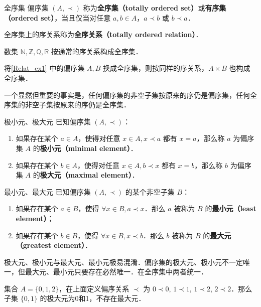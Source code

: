 \begin{definition}{全序集}
偏序集 $(A,\prec)$ 称为\textbf{全序集（totally ordered set）}或\textbf{有序集（ordered set）}，当且仅当对任意 $a,b \in A$，$a \prec b$ 或 $b \prec a$．
\end{definition}
全序集上的序关系称为\textbf{全序关系（totally ordered relation）}．
\begin{example}{}
数集 $\mathbb{N},\mathbb{Z},\mathbb{Q},\mathbb{R}$ 按通常的序关系构成全序集．
\end{example}
\begin{example}{}
将\autoref{Relat_ex1} 中的偏序集 $A,B$ 换成全序集，则按同样的序关系，$A\times B$ 也构成全序集．
\end{example}

一个显然但重要的事实是，任何偏序集的非空子集按原来的序仍是偏序集，任何全序集的非空子集按原来的序仍是全序集．

\begin{definition}{极小元、极大元}
已知偏序集 $(A,\prec)$：
\begin{enumerate}
\item 如果存在某个 $a \in A$，使得对任意 $x \in A, x\prec a$ 都有 $x = a$，那么称 $a$ 为偏序集 $A$ 的\textbf{极小元（minimal element）}．
\item 如果存在某个 $b \in A$，使得对任意 $x \in A, b\prec x$ 都有 $x = b$，那么称 $b$ 为偏序集 $A$ 的\textbf{极大元（maximal element）}．
\end{enumerate}
\end{definition}

\begin{definition}{最小元、最大元}
已知偏序集 $(A,\prec)$ 的某个非空子集 $B$：
\begin{enumerate}
\item 如果存在某个 $a \in B$，使得 $\forall x \in B, a \prec x$．那么 $a$ 被称为 $B$ 的\textbf{最小元（least element）}；
\item 如果存在某个 $b \in B$，使得 $\forall x \in B, x \prec b$．那么 $b$ 被称为 $B$ 的\textbf{最大元（greatest element）}．
\end{enumerate}
\end{definition}

极大元、极小元与最大元、最小元极易混淆．偏序集的极大元、极小元不一定唯一，但最大元、最小元只要存在必然唯一．在全序集中两者统一．

\begin{example}{}
集合 $A=\{0,1,2\}$，在上面定义偏序关系 $\prec$ 为 $0\prec 0$, $1\prec 1$, $1\prec 2$, $2\prec 2$．那么子集 $\{0,1\}$ 的极大元为0和1，不存在最大元．
\end{example}

